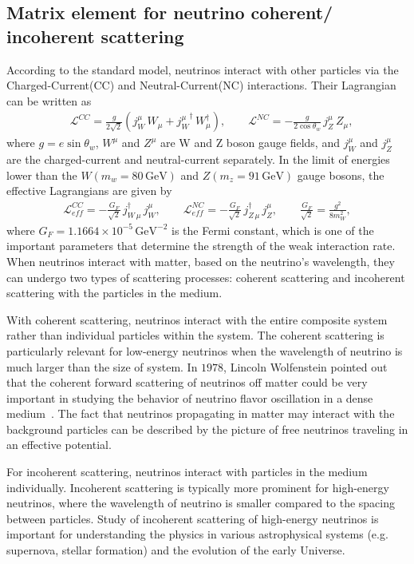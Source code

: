 
\subsection{Matrix element for neutrino coherent/ incoherent scattering}
 According to the standard model, neutrinos interact with other particles via the Charged-Current(CC) and Neutral-Current(NC) interactions. Their Lagrangian can be written as~\cite{Giunti:2007ry}
\begin{align}
&\mathcal{L}^{CC}=\frac{g}{2\sqrt{2}}\left(j^\mu_W\,W_\mu+{j^\mu_W}^\dagger\,W^\dagger_\mu\right),\qquad\mathcal{L}^{NC}=-\frac{g}{2\cos{\theta_w}}\,j^\mu_Z\,Z_\mu,
\end{align}
where $g=e\sin\theta_w$, $W^\mu$ and $Z^\mu$ are W and Z boson gauge fields, and $j^\mu_W$ and $j^\mu_Z$ are the charged-current and neutral-current separately. In the limit of energies lower than the $W(m_w=80\,\mathrm{GeV})$ and $Z(m_z=91\,\mathrm{GeV})$ gauge bosons, the effective Lagrangians are given by
\begin{align}\label{L_low}
\mathcal{L}^{CC}_{eff}=-\frac{G_F}{\sqrt{2}}\,j^\dagger_{W\,\mu}\,j^\mu_W,\qquad
\mathcal{L}^{NC}_{eff}=-\frac{G_F}{\sqrt{2}}\,j^\dagger_{Z\,\mu}\,j^\mu_Z,\qquad \frac{G_F}{\sqrt{2}}=\frac{g^2}{8m^2_W},
\end{align}
where $G_F=1.1664\times10^{-5}\,\mathrm{GeV}^{-2}$ is the Fermi constant, which is one of the important parameters that determine the strength of the weak interaction rate. When neutrinos interact with matter, based on the neutrino's wavelength, they can undergo two types of scattering processes: coherent scattering and incoherent scattering with the particles in the medium. 

With coherent scattering, neutrinos interact with the entire  composite system rather than individual particles within the system. The coherent scattering is particularly relevant for low-energy neutrinos when the wavelength of neutrino is much larger than the size of system. In $1978$, Lincoln Wolfenstein pointed out that the coherent forward scattering of neutrinos off matter could be very important in studying the behavior of neutrino flavor oscillation in a dense medium~\cite{Wolfenstein:1977ue}. The fact that neutrinos propagating in matter may interact with the background particles can be described by the picture of free neutrinos traveling in an effective potential.

For incoherent scattering, neutrinos interact with particles in the medium individually. Incoherent scattering is typically more prominent for high-energy neutrinos, where the wavelength of neutrino is smaller compared to the spacing between particles. Study of incoherent scattering of high-energy neutrinos is important for understanding the physics in various astrophysical systems (e.g. supernova, stellar formation) and the evolution of the early Universe.


